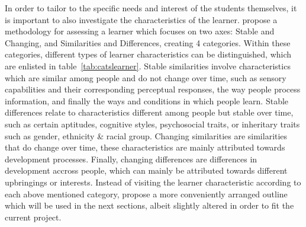 \label{sec:learneranalysis}

In order to tailor to the specific needs and interest of the students themselves, it is important to also investigate the characteristics of the learner.  propose a methodology for assessing a learner which focuses on two axes: Stable and Changing, and Similarities and Differences, creating 4 categories. Within these categories, different types of learner characteristics can be distinguished, which are enlisted in table~\ref{tab:catslearner}. Stable similarities involve characteristics which are similar among people and do not change over time, such as sensory capabilities and their corresponding perceptual responses, the way people process information, and finally the ways and conditions in which people learn. Stable differences relate to characteristics different among people but stable over time, such as certain aptitudes, cognitive styles, psychosocial traits, or inheritary traits such as gender, ethnicity \& racial group. Changing similarities are similarities that do change over time, these characteristics are mainly attributed towards development processes. Finally, changing differences are differences in development accross people, which can mainly be attributed towards different upbringings or interests. Instead of visiting the learner characteristic according to each above mentioned category,  propose a more conveniently arranged outline which will be used in the next sections, albeit slightly altered in order to fit the current project.

